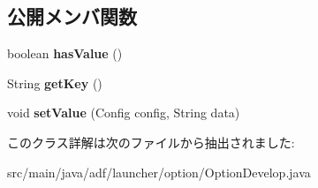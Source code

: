 \subsection*{公開メンバ関数}
\begin{DoxyCompactItemize}
\item 
\hypertarget{classadf_1_1launcher_1_1option_1_1OptionDevelop_a96edb876b291c2e9710a9fad7571ec3a}{}\label{classadf_1_1launcher_1_1option_1_1OptionDevelop_a96edb876b291c2e9710a9fad7571ec3a} 
boolean {\bfseries has\+Value} ()
\item 
\hypertarget{classadf_1_1launcher_1_1option_1_1OptionDevelop_a9f32ccef5ece532e26b392f397f1daf3}{}\label{classadf_1_1launcher_1_1option_1_1OptionDevelop_a9f32ccef5ece532e26b392f397f1daf3} 
String {\bfseries get\+Key} ()
\item 
\hypertarget{classadf_1_1launcher_1_1option_1_1OptionDevelop_acb1ec49d9f40685a57faab7ad40ad0a1}{}\label{classadf_1_1launcher_1_1option_1_1OptionDevelop_acb1ec49d9f40685a57faab7ad40ad0a1} 
void {\bfseries set\+Value} (Config config, String data)
\end{DoxyCompactItemize}


このクラス詳解は次のファイルから抽出されました\+:\begin{DoxyCompactItemize}
\item 
src/main/java/adf/launcher/option/Option\+Develop.\+java\end{DoxyCompactItemize}
